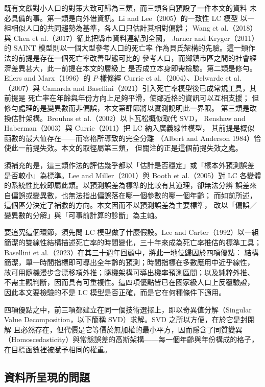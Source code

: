 \documentclass[UTF8, fontset=macnew, a4paper, 12pt]{ctexart}
\begin{document}
既有文獻對小人口的對策大致可歸為三類，而三類各自預設了一件本文的資料
未必具備的事。第一類是向外借資訊。Li and Lee（2005）的一致性 LC 模型
以一組相似人口的共同趨勢為基準，各人口只估計其相對偏離；
Wang et al.（2018）與 Chen et al.（2017）循此把縣市資料連結到全國，
Jarner and Kryger（2011）的 SAINT 模型則以一個大型參考人口的死亡率
作為貝氏架構的先驗。這一類作法的前提是存在一個死亡率改善型態可比的
參考人口，而鄉鎮市區之間的社會經濟差異甚大，此一前提在本文的層級上
是否成立本身即需檢驗。第二類是修勻。Eilers and Marx（1996）的
$P$-樣條經 Currie et al.（2004）、Delwarde et al.（2007）與
Camarda and Basellini（2021）引入死亡率模型後已成常規工具，其前提是
死亡率在年齡與年份方向上足夠平滑，使鄰近格的資訊可以互相支援；
但修勻處理的是變異數而非偏誤，本文第肆節將以實測說明此一界限。
第三類是改換估計架構。Brouhns et al.（2002）以卜瓦松概似取代 SVD，
Renshaw and Haberman（2003）與 Currie（2011）把 LC 納入廣義線性模型，
其前提是概似函數的最大值存在——而零格所導致的完全分離
（Albert and Anderson 1984）恰使此一前提失效。本文的取徑屬第三類，
但關注的正是這個前提失效之處。

須補充的是，這三類作法的評估幾乎都以「估計是否穩定」或「樣本外預測誤差
是否較小」為標準。Lee and Miller（2001）與 Booth et al.（2005）對 LC
各變體的系統性比較即屬此類。以預測誤差為標準的比較有其道理，卻無法分辨
誤差來自偏誤或變異數，也無法指出偏誤落在哪一個參數的哪一個年齡；
而如前所述，這個區分決定了補救的方向。本文因而不以預測誤差為主要標準，
改以「偏誤／變異數的分解」與「可事前計算的診斷」為主軸。

要追究這個環節，須先問 LC 模型做了什麼假設。Lee and Carter（1992）以一組
簡潔的雙線性結構描述死亡率的時間變化，三十年來成為死亡率推估的標準工具；
Basellini et al.（2023）在其三十週年回顧中，將此一地位歸因於四項優點：
結構簡潔，單一時間指標即可導出全年齡的預測；時間指標在多數應用中近乎線性，
故可用隨機漫步含漂移項外推；隨機架構可導出機率預測區間；以及純粹外推、
不需主觀判斷，因而具有可重複性。這四項優點皆已在國家級人口上反覆驗證，
因此本文要檢驗的不是 LC 模型是否正確，而是它在何種條件下適用。

四項優點之中，前三項都建立在同一個技術選擇上，即以奇異值分解（Singular
Value Decomposition，以下簡稱 SVD）求解。SVD 之所以方便，在於它是封閉解
且必然存在，但代價是它等價於無加權的最小平方，因而隱含了同質變異
（Homoscedasticity）與常態誤差的高斯架構——每一個年齡與年份構成的格子，
在目標函數裡被賦予相同的權重。

\subsection{資料所呈現的問題}\label{sec:intro-data}
\end{document}

